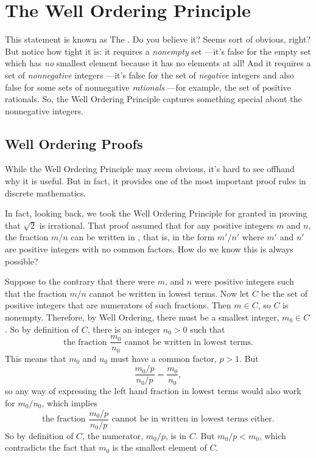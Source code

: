 \chapter{The Well Ordering Principle}
\label{well_ordering_chap}


This statement is known as The .  Do you
believe it?  Seems sort of obvious, right?  But notice how tight it is: it
requires a \emph{nonempty} set ---it's false for the empty set which has
\emph{no} smallest element because it has no elements at all!  And it
requires a set of \emph{nonnegative} integers ---it's false for the set of
\emph{negative} integers and also false for some sets of nonnegative
\emph{rationals} ---for example, the set of positive rationals.  So, the
Well Ordering Principle captures something special about the nonnegative
integers.

\section{Well Ordering Proofs}

While the Well Ordering Principle may seem obvious, \iffalse it looks
nothing like the induction axiom, and\fi it's hard to see offhand why it
is useful.  But in fact, it provides one of the most important proof rules
in discrete mathematics.  \iffalse We'll explain this after we introduce a
template for well ordering principle proofs resembling the template in
Section~\ref{templ-induct-proofs} for a proof by strong induction.\fi

In fact, looking back, we took the Well Ordering Principle for granted in
proving that $\sqrt{2}$ is irrational.  That proof assumed that for any
positive integers $m$ and $n$, the fraction $m/n$ can be written in
, that is, in the form $m'/n'$ where $m'$ and $n'$
are positive integers with no common factors.  How do we know this is
always possible?

Suppose to the contrary that there were $m$, and $n$ were positive
integers such that the fraction $m/n$ cannot be written in lowest
terms.  Now let $C$ be the set of positive integers that are
numerators of such fractions.  Then $m \in C$, so $C$ is nonempty.
Therefore, by Well Ordering, there must be a smallest integer, $m_0
\in C$.  So by definition of $C$, there is an integer $n_0 > 0$ such
that
\[
\text{the fraction } \frac{m_0}{n_0} \text{ cannot be written in lowest
terms.}
\]
This means that $m_0$ and $n_0$ must have a common factor, $p>1$.  But
\[
\frac{m_0/p}{n_0/p} = \frac{m_0}{n_0},
\]
so any way of expressing the left hand fraction in lowest terms would also
work for $m_0/n_0$, which implies
\[
\text{the fraction } \frac{m_0/p}{n_0/p} \text{ cannot be in written in
lowest terms either.}
\]
So by definition of $C$, the numerator, $m_0/p$, is in $C$.  But $m_0/p <
m_0$, which contradicts the fact that $m_0$ is the smallest element of $C$.

